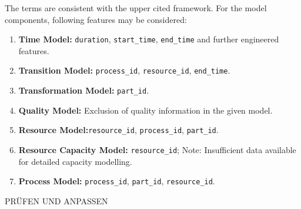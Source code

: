 The terms are consistent with the upper cited framework. For the model components, following features may be considered:

\begin{enumerate}
  \item \textbf{Time Model:} \texttt{duration}, \texttt{start\_time}, \texttt{end\_time} and further engineered features.

  \item \textbf{Transition Model:} \texttt{process\_id}, \texttt{resource\_id}, \texttt{end\_time}.

  \item \textbf{Transformation Model:} \texttt{part\_id}.

  \item \textbf{Quality Model:} Exclusion of quality information in the given model.

  \item \textbf{Resource Model:}\texttt{resource\_id}, \texttt{process\_id}, \texttt{part\_id}.

  \item \textbf{Resource Capacity Model:} \texttt{resource\_id}; Note: Insufficient data available for detailed capacity modelling.

  \item \textbf{Process Model:} \texttt{process\_id}, \texttt{part\_id}, \texttt{resource\_id}.
\end{enumerate} PRÜFEN UND ANPASSEN

